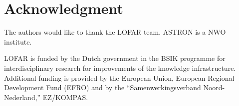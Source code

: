 \documentclass[journal]{IEEEtran}
\begin{document}

%



\section{}


\section*{Acknowledgment}


The authors would like to thank the LOFAR team. ASTRON is a NWO institute.

LOFAR is funded by the Dutch government in the BSIK programme for
interdisciplinary research for improvements of the knowledge infrastructure.
Additional funding is provided by the European Union, European Regional
Development Fund (EFRO) and by the ``Samenwerkingsverband Noord-Nederland,''
EZ/KOMPAS.
\end{document}
